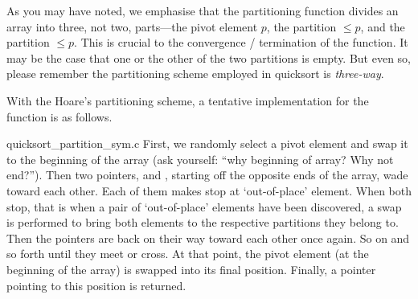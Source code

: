 As you may have noted, we emphasise that the partitioning function divides an array into three, not
two, parts---the pivot element $p$, the partition $\leq p$, and the partition $\leq p$.
This is crucial to the convergence / termination of the function.
It may be the case that one or the other of the two partitions is empty.
But even so, please remember the partitioning scheme employed in quicksort is \emph{three-way}.


With the Hoare's partitioning scheme, a tentative implementation for the function  is as
follows.

{quicksort_partition_sym.c}
First, we randomly select a pivot element and swap it to the beginning of the array
(ask yourself: ``why beginning of array?
Why not end?'').
Then two pointers,  and , starting off the opposite ends of the array,
wade toward each other.
Each of them makes stop at `out-of-place' element.
When both stop, that is when a pair of `out-of-place' elements have been discovered,
a swap is performed to bring both elements to the respective partitions they belong to.
Then the pointers are back on their way toward each other once again.
So on and so forth until they meet or cross.
At that point, the pivot element (at the beginning of the array) is swapped into its final position.
Finally, a pointer pointing to this position is returned.


